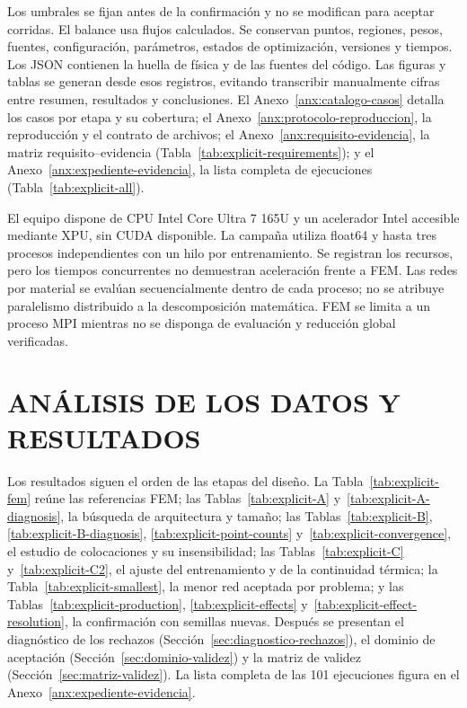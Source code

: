 Los umbrales se fijan antes de la confirmación y no se modifican para aceptar corridas. El balance usa flujos calculados. Se conservan puntos, regiones, pesos, fuentes, configuración, parámetros, estados de optimización, versiones y tiempos. Los JSON contienen la huella de física y de las fuentes del código. Las figuras y tablas se generan desde esos registros, evitando transcribir manualmente cifras entre resumen, resultados y conclusiones. El Anexo~\ref{anx:catalogo-casos} detalla los casos por etapa y su cobertura; el Anexo~\ref{anx:protocolo-reproduccion}, la reproducción y el contrato de archivos; el Anexo~\ref{anx:requisito-evidencia}, la matriz requisito--evidencia (Tabla~\ref{tab:explicit-requirements}); y el Anexo~\ref{anx:expediente-evidencia}, la lista completa de ejecuciones (Tabla~\ref{tab:explicit-all}).

El equipo dispone de CPU Intel Core Ultra 7 165U y un acelerador Intel accesible mediante XPU, sin CUDA disponible. La campaña utiliza float64 y hasta tres procesos independientes con un hilo por entrenamiento. Se registran los recursos, pero los tiempos concurrentes no demuestran aceleración frente a FEM. Las redes por material se evalúan secuencialmente dentro de cada proceso; no se atribuye paralelismo distribuido a la descomposición matemática. FEM se limita a un proceso MPI mientras no se disponga de evaluación y reducción global verificadas.

\section{ANÁLISIS DE LOS DATOS Y RESULTADOS}
\label{sec:analisis-resultados}

Los resultados siguen el orden de las etapas del diseño. La Tabla~\ref{tab:explicit-fem} reúne las referencias FEM; las Tablas~\ref{tab:explicit-A} y~\ref{tab:explicit-A-diagnosis}, la búsqueda de arquitectura y tamaño; las Tablas~\ref{tab:explicit-B}, \ref{tab:explicit-B-diagnosis}, \ref{tab:explicit-point-counts} y~\ref{tab:explicit-convergence}, el estudio de colocaciones y su insensibilidad; las Tablas~\ref{tab:explicit-C} y~\ref{tab:explicit-C2}, el ajuste del entrenamiento y de la continuidad térmica; la Tabla~\ref{tab:explicit-smallest}, la menor red aceptada por problema; y las Tablas~\ref{tab:explicit-production}, \ref{tab:explicit-effects} y~\ref{tab:explicit-effect-resolution}, la confirmación con semillas nuevas. Después se presentan el diagnóstico de los rechazos (Sección~\ref{sec:diagnostico-rechazos}), el dominio de aceptación (Sección~\ref{sec:dominio-validez}) y la matriz de validez (Sección~\ref{sec:matriz-validez}). La lista completa de las 101 ejecuciones figura en el Anexo~\ref{anx:expediente-evidencia}.


